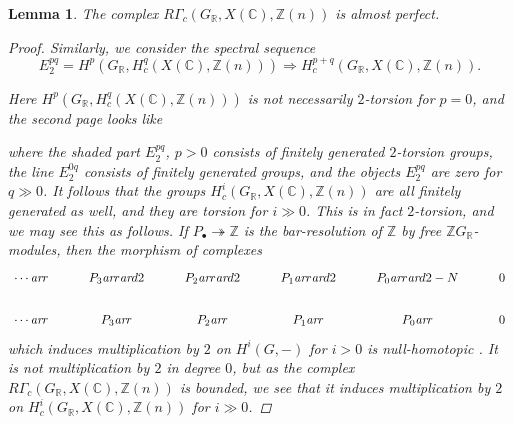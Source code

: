 \documentclass[leqno,12pt]{article}
\theoremstyle{plain}
\newtheorem{lemma}[theorem]{\indent\sc Lemma}
\theoremstyle{definition}
\newcommand{\CC}{\mathbb{C}}
\newcommand{\RR}{\mathbb{R}}
\newcommand{\ZZ}{\mathbb{Z}}
\newcommand{\ar}{\text{\it ar}}
\begin{document}
\begin{lemma}
  \label{lemma:RGammac(GR,X(C),Z(n))-almost-perfect}
  The complex $R\Gamma_c (G_\RR, X (\CC), \ZZ (n))$
  is almost perfect.

  \begin{proof}
    Similarly, we consider the spectral sequence
    \[ E_2^{pq} = H^p (G_\RR, H^q_c (X (\CC), \ZZ (n)))
    \Longrightarrow
    H^{p+q}_c (G_\RR, X (\CC), \ZZ (n)). \]

    Here $H^p (G_\RR, H^q_c (X (\CC), \ZZ (n)))$ is not necessarily $2$-torsion
    for $p = 0$, and the second page looks like
    \begin{center}
    \end{center}
    where the shaded part $E_2^{pq}$, $p > 0$ consists of finitely generated
    $2$-torsion groups, the line $E_2^{0q}$ consists of finitely generated
    groups, and the objects $E_2^{pq}$ are zero for $q \gg 0$. It follows that
    the groups $H^i_c (G_\RR, X (\CC), \ZZ (n))$ are all finitely generated as
    well, and they are torsion for $i \gg 0$. This is in fact $2$-torsion, and
    we may see this as follows. If $P_\bullet \twoheadrightarrow \ZZ$ is the
    bar-resolution of $\ZZ$ by free $\ZZ G_\RR$-modules, then the morphism of
    complexes
    \[ \begin{tikzcd}
      \cdots\ar{r} & P_3\ar{r}\ar{d}{2} & P_2\ar{r}\ar{d}{2} & P_1\ar{r}\ar{d}{2} & P_0\ar{r}\ar{d}{2-N} & 0 \\
      \cdots\ar{r} & P_3\ar{r} & P_2\ar{r} & P_1\ar{r} & P_0\ar{r} & 0
    \end{tikzcd} \]
    which induces multiplication by $2$ on $H^i (G,-)$ for $i > 0$
    is null-homotopic \cite[Theorem~6.5.8]{Weibel-1994}. It is not
    multiplication by $2$ in degree $0$, but as the complex
    $R\Gamma_c (G_\RR, X (\CC), \ZZ (n))$ is bounded, we see that it induces
    multiplication by $2$ on $H^i_c (G_\RR, X (\CC), \ZZ (n))$ for $i \gg 0$.
  \end{proof}
\end{lemma}
\end{document}
